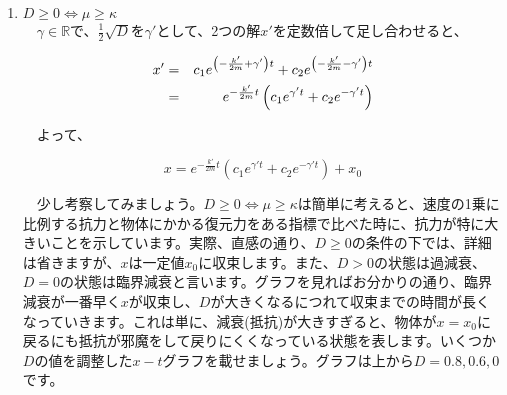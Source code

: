 \begin{enumerate}
    \item $D\geq 0 \Leftrightarrow \mu \geq \kappa$\\
            　$\gamma\in\mathbb{R}$で、$\frac{1}{2}\sqrt{D}$を$\gamma'$として、2つの解$x'$を定数倍して足し合わせると、
            
            \begin{eqnarray}
                x' &=& c_1 e^{\left(-\frac{k'}{2m}+\gamma'\right)t} + c_2 e^{\left(-\frac{k'}{2m}-\gamma'\right)t} \notag \\
                   &=& e^{-\frac{k'}{2m}t}\left(c_1e^{\gamma't}+c_2e^{-\gamma't}\right) \notag
            \end{eqnarray}
            
            　よって、
            
            \begin{equation}
                x=e^{-\frac{k'}{2m}t}\left(c_1e^{\gamma't}+c_2e^{-\gamma't}\right)+x_0
            \end{equation}
            
            　少し考察してみましょう。$D\geq 0 \Leftrightarrow \mu \geq \kappa$は簡単に考えると、速度の1乗に比例する抗力と物体にかかる復元力をある指標で比べた時に、抗力が特に大きいことを示しています。実際、直感の通り、$D\geq 0$の条件の下では、詳細は省きますが、$x$は一定値$x_0$に収束します。また、$D>0$の状態は過減衰、$D=0$の状態は臨界減衰と言います。グラフを見ればお分かりの通り、臨界減衰が一番早く$x$が収束し、$D$が大きくなるにつれて収束までの時間が長くなっていきます。これは単に、減衰(抵抗)が大きすぎると、物体が$x=x_0$に戻るにも抵抗が邪魔をして戻りにくくなっている状態を表します。いくつか$D$の値を調整した$x-t$グラフを載せましょう。グラフは上から$D=0.8,0.6,0$です。
            
            
            
            \begin{figure}[htbp]
            \begin{center}
\end{center}
\end{figure}
\end{enumerate}

